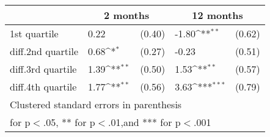 {
\def\sym#1{\ifmmode^{#1}\else\(^{#1}\)\fi}
\begin{tabular*}{.65\hsize}{@{\hskip\tabcolsep\extracolsep\fill}l*{2}{lc}}
\toprule
                &\multicolumn{2}{c}{2 months}&\multicolumn{2}{c}{12 months}\\
\midrule
1st quartile    &     0.22         &   (0.40)&    -1.80\sym{**} &   (0.62)\\
diff.2nd quartile&     0.68\sym{*}  &   (0.27)&    -0.23         &   (0.51)\\
diff.3rd quartile&     1.39\sym{**} &   (0.50)&     1.53\sym{**} &   (0.57)\\
diff.4th quartile&     1.77\sym{**} &   (0.56)&     3.63\sym{***}&   (0.79)\\
\bottomrule
\multicolumn{5}{l}{\footnotesize Clustered standard errors in parenthesis}\\
\multicolumn{5}{l}{\footnotesize * for p$<$.05, ** for p$<$.01,and *** for p$<$.001}\\
\end{tabular*}
}
